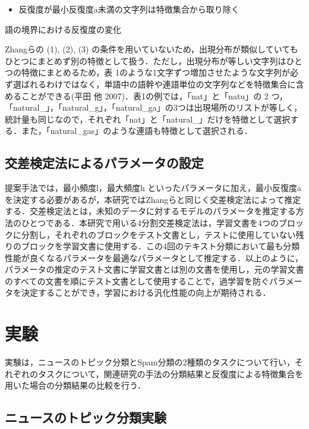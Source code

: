 \documentclass[japanese]{jnlp_1.4}
\begin{document}
\begin{itemize}
\item 反復度が最小反復度a未満の文字列は特徴集合から取り除く
\end{itemize}

\begin{table}[t]
\caption{語の境界における反復度の変化}

\end{table}


Zhangらの (1), (2), (3) の条件を用いていないため，出現分布が類似していてもひとつにまとめず別の特徴として扱う．ただし，出現分布が等しい文字列はひとつの特徴にまとめるため，表 
1のような1文字ずつ増加させたような文字列が必ず選ばれるわけではなく，単語中の語幹や連語単位の文字列などを特徴集合に含めることができる(平田 他 2007)．表1の例では，「nat」と「natu」の 2 
つ，「natural{\_}」，「natural{\_}g」，「natural{\_}ga」の3つは出現場所のリストが等しく，統計量も同じなので，それぞれ「nat」と「natural{\_}」だけを特徴として選択する．また，「natural{\_}gas」のような連語も特徴として選択される．


\subsection{交差検定法によるパラメータの設定}

提案手法では，最小頻度l，最大頻度h といったパラメータに加え，最小反復度a 
を決定する必要があるが，本研究ではZhangらと同じく交差検定法によって推定する．交差検定法とは，未知のデータに対するモデルのパラメータを推定する方法のひとつである．本研究で用いる4分割交差検定法は，学習文書を4つのブロックに分割し，それぞれのブロックをテスト文書とし，テストに使用していない残りのブロックを学習文書に使用する．この4回のテキスト分類において最も分類性能が良くなるパラメータを最適なパラメータとして推定する．以上のように，パラメータの推定のテスト文書に学習文書とは別の文書を使用し，元の学習文書のすべての文書を順にテスト文書として使用することで，過学習を防ぐパラメータを決定することができ，学習における汎化性能の向上が期待される．



\section{実験}

実験は，ニュースのトピック分類とSpam分類の2種類のタスクについて行い，それぞれのタスクについて，関連研究の手法の分類結果と反復度による特徴集合を用いた場合の分類結果の比較を行う．


\subsection{ニュースのトピック分類実験}
\end{document}
